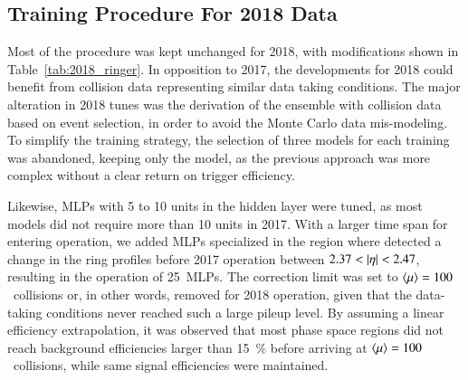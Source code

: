 



\FloatBarrier
\subsection{Training Procedure For 2018 Data}\label{ssec:2018}

Most of the procedure was kept unchanged for 2018, with modifications shown in
Table~\ref{tab:2018_ringer}.
In opposition to 2017, the developments for 2018
could benefit from collision data 
representing similar data taking conditions.
The major alteration in 2018 tunes was the derivation of the \rnn{} ensemble with collision data based on \Zee{} \tnp{} event selection, in order to avoid the Monte Carlo data mis-modeling.
To simplify the training strategy, the selection of three models for each training was abandoned, keeping only the \spmax{} model, as the previous approach was more complex without a clear return on trigger efficiency. 

Likewise, MLPs with 5 to 10 units in the hidden layer were tuned, as most models did not require
more than 10 units in 2017. With a larger time span for entering operation, we
added MLPs specialized in the region where detected a change in the ring
profiles before 2017 operation between $2.37<\abseta<2.47$, resulting in the operation of
\SI{25}{MLPs}. The correction limit was set to
$\langle \mu \rangle{}=100$~collisions or, in other words, removed for 2018 operation, given
that the data-taking 
conditions never reached such a large pileup level. By
assuming a linear efficiency extrapolation,%
it was observed that most phase space regions did not reach background efficiencies
larger than \SI{15}{\%} before arriving at $\langle \mu \rangle=100$~collisions, while same
signal efficiencies were maintained.






